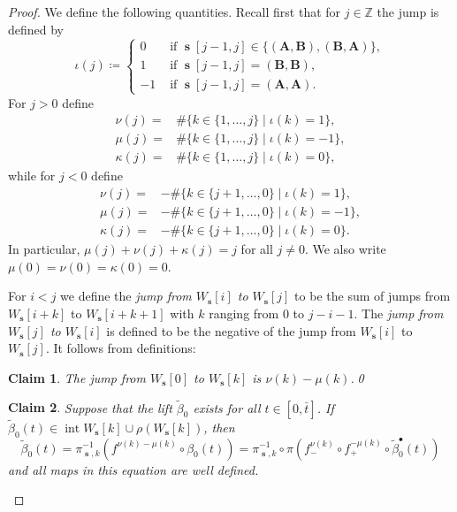 \documentclass[]{amsart}
\newcommand\intr{\operatorname{int}}
\newcommand\seq{{\operatorname{\mathbf s}}}
\newcommand\oseq{{\bullet}}
\newcommand{\A}{\mathbf A}
\newcommand{\B}{\mathbf B}
\newcommand\wbeta{{\widetilde \beta}}
\newtheorem{claim2}{Claim}
\newcommand{\Z}{\mathbb{Z}}
\theoremstyle{remark}
\numberwithin{equation}{section}
\theoremstyle{definition}
\begin{document}
\begin{proof}
We define the following quantities. Recall first that for $j\in \Z$ the jump is defined by 
\[ \iota(j)\coloneqq \begin{cases}
0& \text{ if }\seq[j-1,j]\in  \{(\A,\B), (\B,\A)\}, \\
1& \text{ if }\seq[j-1,j]= (\B,\B),\\
-1& \text{ if }\seq[j-1,j]= (\A,\A).
\end{cases}\]
For $j>0$ define 
  \begin{equation}
  \label{eq:dfn:numukappa+}
    \begin{aligned}
      \nu(j)= & \#\{k\in \{1,\dots, j\} \mid \iota(k)=1\},\\
      \mu(j)= & \#\{k\in \{1,\dots, j\} \mid \iota(k)=-1\}, \\
      \kappa(j) =& \#\{k\in \{1,\dots, j\} \mid \iota(k)=0\},
    \end{aligned}
  \end{equation}
 while for $j<0$ define 
 \begin{equation}
   \label{eq:dfn:numukappa-}
   \begin{aligned}
     \nu(j)= &- \#\{k\in \{j+1,\dots, 0\} \mid \iota(k)=1\},\\
     \mu(j)= &- \#\{k\in \{j+1,\dots, 0\} \mid \iota(k)=-1\}, \\
     \kappa(j) =& -\#\{k\in \{j+1,\dots, 0\} \mid \iota(k)=0\}.
   \end{aligned}
 \end{equation}
 In particular, $\mu(j)+\nu(j)+\kappa(j)=j$ for all $j\not=0$. We also write $\mu(0)=\nu(0)=\kappa(0)=0$.
 
 For $i<j$ we define the \emph{jump from $W_\seq[i]$ to $W_\seq[j]$} to be the sum of jumps from $W_\seq[i+k]$ to $W_\seq[i+k+1]$ with $k$ ranging from $0$ to $j-i-1$. The \emph{jump from $W_\seq[j]$ to $W_\seq[i]$} is defined to be the negative of the jump from $W_\seq[i]$ to $W_\seq[j]$. It follows from definitions:
 \begin{claim2}
 \label{cl2:jump is nu min mu}
 The jump from $W_\seq [0]$ to $W_\seq [k]$ is $\nu(k)-\mu(k)$.\qed
 \end{claim2}


\begin{claim2}
\label{cl2:lifting form}
Suppose that the lift $\widetilde \beta_0$ exists for all $t\in [0,\bar t]$. If $\widetilde \beta_0(t)\in {\intr W_\seq [k]\cup \rho(W_\seq [k])}$, then
\begin{equation}
\label{eq:MainId}
 \widetilde \beta_0(t) = \pi^ {-1}_{\seq,k}\left(f^ {\nu(k)-\mu(k)}\circ \beta_0(t)\right)= \pi^ {-1}_{\seq,k}\circ \pi \left(f^ {\nu(k)}_-\circ f_+^ {-\mu(k)}\circ \wbeta^{\oseq}_0(t)\right)
\end{equation}
and all maps in this equation are well defined. 
\end{claim2}


\end{proof}
\end{document}
